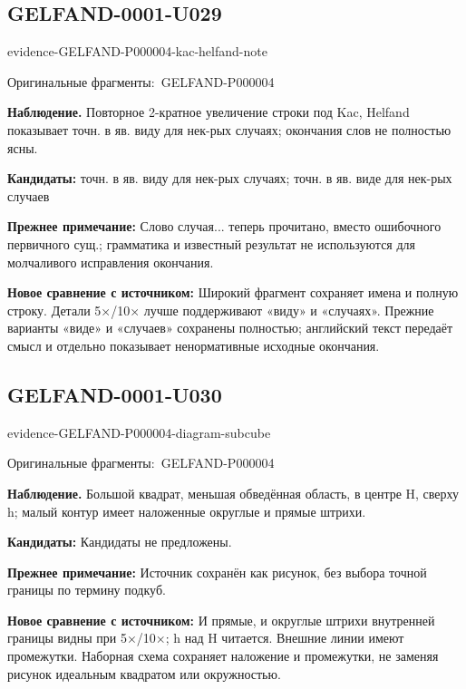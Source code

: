 \documentclass[11pt]{article}
\newcommand{\EvidenceBlock}[4]{%
 \par\smallskip\noindent\begin{minipage}{\linewidth}
 \begin{minipage}[t]{.47\linewidth}\vspace{0pt}\centering
 \csname evidence-#1-#2\endcsname\par
 {\scriptsize\SourceCropCaption\ #1}\par
 \end{minipage}\hfill
 \begin{minipage}[t]{.49\linewidth}\vspace{0pt}\raggedright
 {\small\color{orange!65!black}\textbf{#4} #3}\par
 \end{minipage}
 \end{minipage}\par\smallskip}
\newcommand{\SourceCropCaption}{Оригинальные фрагменты:}\newcommand{\ReadingCaption}{Сомнительное чтение.}\newcommand{\IncompleteCaption}{Неразобранный фрагмент.}\newcommand{\DiagramCaption}{Рисунок и набранное описание.}
\begin{document}
\subsection*{GELFAND-0001-U029}
\EvidenceBlock{GELFAND-P000004}{kac-helfand-note}{Повторное 2-кратное увеличение строки под Kac, Helfand показывает точн. в яв. виду для нек-рых случаях; окончания слов не полностью ясны.}{Наблюдение.}
\par\smallskip\noindent\textbf{Кандидаты: } точн. в яв. виду для нек-рых случаях; точн. в яв. виде для нек-рых случаев\par
\par\smallskip\noindent\textbf{Прежнее примечание: } Слово случая... теперь прочитано, вместо ошибочного первичного сущ.; грамматика и известный результат не используются для молчаливого исправления окончания.\par
\par\smallskip\noindent\textbf{Новое сравнение с источником: } Широкий фрагмент сохраняет имена и полную строку. Детали 5×/10× лучше поддерживают «виду» и «случаях». Прежние варианты «виде» и «случаев» сохранены полностью; английский текст передаёт смысл и отдельно показывает ненормативные исходные окончания.\par

\subsection*{GELFAND-0001-U030}
\EvidenceBlock{GELFAND-P000004}{diagram-subcube}{Большой квадрат, меньшая обведённая область, в центре H, сверху h; малый контур имеет наложенные округлые и прямые штрихи.}{Наблюдение.}
\par\smallskip\noindent\textbf{Кандидаты: } Кандидаты не предложены.\par
\par\smallskip\noindent\textbf{Прежнее примечание: } Источник сохранён как рисунок, без выбора точной границы по термину подкуб.\par
\par\smallskip\noindent\textbf{Новое сравнение с источником: } И прямые, и округлые штрихи внутренней границы видны при 5×/10×; h над H читается. Внешние линии имеют промежутки. Наборная схема сохраняет наложение и промежутки, не заменяя рисунок идеальным квадратом или окружностью.\par
\end{document}
